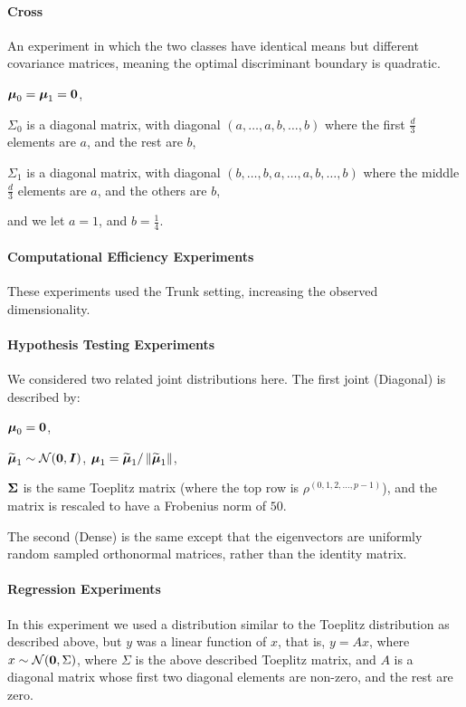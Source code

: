 \documentclass[11pt]{extarticle}
\begin{document}
\paragraph*{Cross}
An experiment in which the two classes have identical means but different covariance matrices, meaning the optimal discriminant boundary is quadratic.
\begin{compactitem}
\item $\boldsymbol{\mu}_0 = \boldsymbol{\mu}_1 = \boldsymbol{0}$,
\item $\Sigma_0$ is a diagonal matrix, with diagonal $\left(a, \hdots, a, b, \hdots, b\right)$ where the first $\frac{d}{3}$ elements are $a$, and the rest are $b$,
\item $\Sigma_1$ is a diagonal matrix, with diagonal $\left(b, \hdots, b, a, \hdots, a, b, \hdots, b\right)$ where the middle $\frac{d}{3}$ elements are $a$, and the others are $b$,
\end{compactitem}
and we let $a=1$, and $b=\frac{1}{4}$.


\paragraph*{Computational Efficiency Experiments} These experiments used the Trunk setting, increasing the observed dimensionality.



\paragraph*{Hypothesis Testing Experiments} We considered two related joint distributions here.  The first joint (Diagonal) is described by:
\begin{compactitem}
\item $\boldsymbol{\mu}_0=\boldsymbol{0}$,
\item $\widetilde{\boldsymbol{\mu}}_1 \sim \mathcal{N}(\boldsymbol{0}, \boldsymbol{I})$, $\boldsymbol{\mu}_1 = \widetilde{\boldsymbol{\mu}}_1 / \left \lVert\widetilde{\boldsymbol{\mu}}_1 \right \rVert$,
\item $\boldsymbol{\Sigma}$ is the same Toeplitz matrix (where the top row is $\rho^{(0,1,2,\ldots,p-1)}$), and the matrix is rescaled to have a Frobenius norm of $50$.
\end{compactitem}
The second (Dense) is the same except that the eigenvectors are uniformly random sampled orthonormal matrices, rather than the identity matrix.


\paragraph*{Regression Experiments} In this experiment we used a distribution similar to the Toeplitz distribution as described above, but $y$ was a linear function of $x$, that is, $y=Ax$, where $x \sim \mathcal{N}(\boldsymbol{0},\Sigma)$, where $\Sigma$ is the above described Toeplitz matrix, and $A$ is a diagonal matrix whose first two diagonal elements are non-zero, and the rest are zero.
\end{document}
